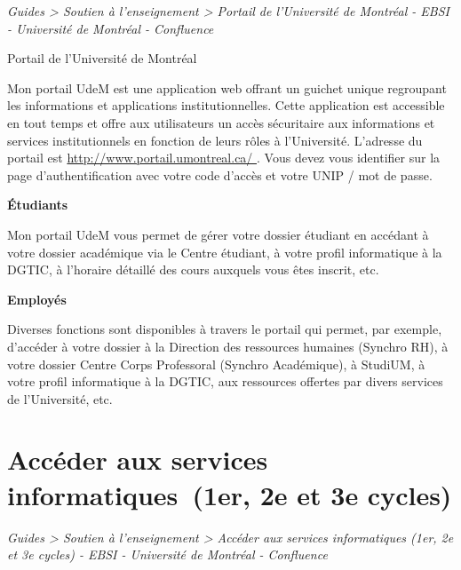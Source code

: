 \documentclass [12 pt]{article}
\begin{document}
        
        
        \textit{
        Guides > Soutien à l'enseignement > Portail de l'Université de
            Montréal - EBSI - Université de Montréal - Confluence
        }
    
        Portail de l'Université de Montréal
        
            Mon portail UdeM est une application web offrant un guichet unique regroupant les
                informations et applications institutionnelles. Cette application est accessible en
                tout temps et offre aux utilisateurs un accès sécuritaire aux informations et
                services institutionnels en fonction de leurs rôles à l'Université. L'adresse
                    du portail est 
        \href{
        http://www.portail.umontreal.ca/
        } {
        http://www.portail.umontreal.ca/
        }
    .
                    Vous devez vous identifier sur la page d'authentification avec votre code
                    d'accès et votre UNIP / mot de passe.
            
        \textbf{
        Étudiants
        }
    
            Mon portail UdeM vous permet de gérer votre dossier étudiant en accédant à votre
                dossier académique via le Centre étudiant, à votre profil informatique à la DGTIC, à
                l’horaire détaillé des cours auxquels vous êtes inscrit, etc.
            
        \textbf{
        Employés
        }
    
            Diverses fonctions sont disponibles à travers le portail qui permet, par exemple,
                d'accéder à votre dossier à la Direction des ressources humaines (Synchro RH), à
                votre dossier Centre Corps Professoral (Synchro Académique), à StudiUM, à votre
                profil informatique à la DGTIC, aux ressources offertes par divers services de
                l'Université, etc.
        
    
    
        \newpage
        \section {
        Accéder aux services informatiques (1er, 2e et 3e cycles)
        }
        
        
        
        \textit{
        Guides > Soutien à l'enseignement > Accéder aux services informatiques
            (1er, 2e et 3e cycles) - EBSI - Université de Montréal - Confluence
        }
    
\end{document}
